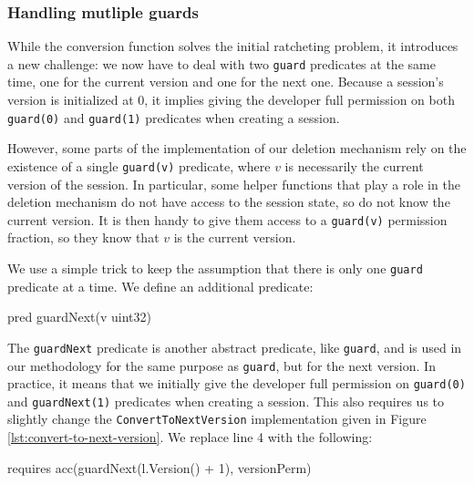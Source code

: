 \subsubsection{Handling mutliple guards}
\label{sec:handling-mutliple-guards}

While the conversion function solves the initial ratcheting problem, it introduces a new challenge: we now have to deal with two \texttt{guard} predicates at the same time, one for the current version and one for the next one.
Because a session's version is initialized at $0$, it implies giving the developer full permission on both \texttt{guard(0)} and \texttt{guard(1)} predicates when creating a session.

However, some parts of the implementation of our deletion mechanism rely on the existence of a single \texttt{guard(v)} predicate, where $v$ is necessarily the current version of the session.
In particular, some helper functions that play a role in the deletion mechanism do not have access to the session state, so do not know the current version.
It is then handy to give them access to a \texttt{guard(v)} permission fraction, so they know that $v$ is the current version.

We use a simple trick to keep the assumption that there is only one \texttt{guard} predicate at a time. We define an additional predicate:
\begin{gobra}
pred guardNext(v uint32)
\end{gobra}

The \texttt{guardNext} predicate is another abstract predicate, like \texttt{guard}, and is used in our methodology for the same purpose as \texttt{guard}, but for the next version. 
In practice, it means that we initially give the developer full permission on \texttt{guard(0)} and \texttt{guardNext(1)} predicates when creating a session.
This also requires us to slightly change the \texttt{ConvertToNextVersion} implementation given in Figure \ref{lst:convert-to-next-version}.
We replace line 4 with the following:
\begin{gobra}
requires acc(guardNext(l.Version() + 1), versionPerm)
\end{gobra}

